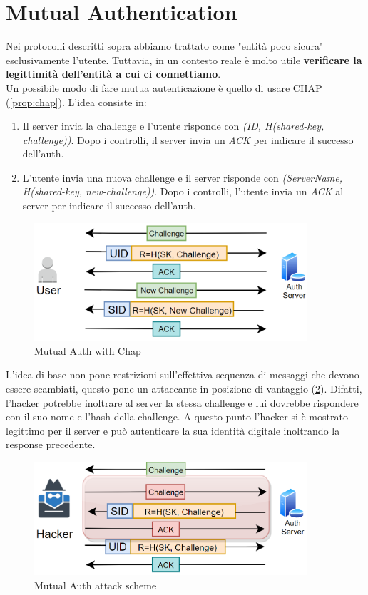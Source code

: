 \section{Mutual Authentication}\label{chap:mutualauth}
Nei protocolli descritti sopra abbiamo trattato come "entità poco sicura" esclusivamente l'utente. Tuttavia, in un contesto reale è molto utile \textbf{verificare la legittimità dell'entità a cui ci connettiamo}.\\
Un possibile modo di fare mutua autenticazione è quello di usare CHAP (\cref{prop:chap}). L'idea consiste in:
\begin{enumerate}
    \item Il server invia la challenge e l'utente risponde con \textit{(ID, H(shared-key, challenge))}. Dopo i controlli, il server invia un \textit{ACK} per indicare il successo dell'auth.
    \item L'utente invia una nuova challenge e il server risponde con \textit{(ServerName, H(shared-key, new-challenge))}. Dopo i controlli, l'utente invia un \textit{ACK} al server per indicare il successo dell'auth.
\end{enumerate}
\begin{figure}[h]
    \centering
    \includegraphics[width=0.9\textwidth]{image/chapmutual.png}
    \caption{Mutual Auth with Chap}
    \label{fig:chapmutual}
\end{figure}
\begin{remark}
L'idea di base non pone restrizioni sull'effettiva sequenza di messaggi che devono essere scambiati, questo pone un attaccante in posizione di vantaggio (\cref{fig:chapmutualatk}). Difatti, l'hacker potrebbe inoltrare al server la stessa challenge e lui dovrebbe rispondere con il suo nome e l'hash della challenge. A questo punto l'hacker si è mostrato legittimo per il server e può autenticare la sua identità digitale inoltrando la response precedente. 
\end{remark}
\begin{figure}[h]
    \centering
    \includegraphics[width=0.9\textwidth]{image/chapmutualatk.png}
    \caption{Mutual Auth attack scheme}
    \label{fig:chapmutualatk}
\end{figure}
